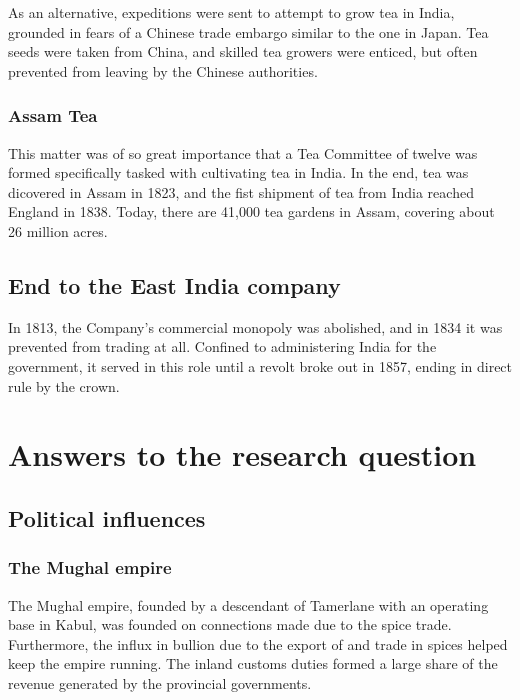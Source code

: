 \documentclass[11pt, a4paper, headings=standardclasses]{scrartcl}
\begin{document}
As an alternative, expeditions were sent to attempt to grow tea in India, grounded in fears of a Chinese trade embargo similar to the one in Japan.\autocite[211]{Tea} Tea seeds were taken from China, and skilled tea growers were enticed, but often prevented from leaving by the Chinese authorities.\autocite[210]{Tea}

\subsubsection{Assam Tea}

This matter was of so great importance that a Tea Committee of twelve was formed specifically tasked with cultivating tea in India.\autocite[210]{Tea} In the end, tea was dicovered in Assam in 1823,\autocite[209]{Tea} and the fist shipment of tea from India reached England in 1838. Today, there are 41,000 tea gardens in Assam, covering about 26 million acres.\autocite{roy}\label{assam}

\subsection{End to the East India company}

In 1813, the Company's commercial monopoly was abolished, and in 1834 it was prevented from trading at all. Confined to administering India for the government, it served in this role until a revolt broke out in 1857, ending in direct rule by the crown.\autocite{parliament}

\section{Answers to the research question}

\subsection{Political influences}
\subsubsection{The Mughal empire}

The Mughal empire, founded by a descendant of Tamerlane\autocite[6]{richards} with an operating base in Kabul, was founded on connections made due to the spice trade. Furthermore, the influx in bullion due to the export of and trade in spices helped keep the empire running. The inland customs duties formed a large share of the revenue generated by the provincial governments.\autocite[257]{RF}
\end{document}
